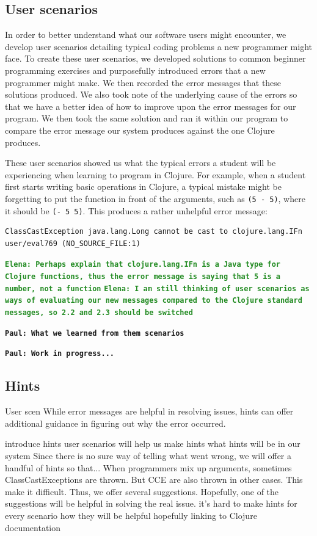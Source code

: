 \documentclass[12pt]{article}
\newcommand{\comment}[1]{{\bf \tt  {#1}}}
\newcommand{\emcomment}[1]{\textcolor{ForestGreen}{\comment{Elena: {#1}}}}
\newcommand{\pscomment}[1]{\textcolor{Coquelicot}{\comment{Paul: {#1}}}}
\begin{document}
\subsection{User scenarios}\label{sec:scenarios}

In order to better understand what our software users might encounter, we develop user scenarios detailing typical coding problems a new programmer might face.
To create these user scenarios, we developed solutions to common beginner programming exercises and purposefully introduced errors that a new programmer might make.
We then recorded the error messages that these solutions produced.
We also took note of the underlying cause of the errors so that we have a better idea of how to improve upon the error messages for our program.
We then took the same solution and ran it within our program to compare the error message our system produces against the one Clojure produces.  

These user scenarios showed us what the typical errors a student will be experiencing when learning to program in Clojure.
For example, when a student first starts writing basic operations in Clojure, a typical mistake might be forgetting to put the function in front of the arguments,
such as \texttt{(5 - 5)}, where it should be \texttt{(- 5 5)}. 
This produces a rather unhelpful error message: 

\begin{verbatim}
ClassCastException java.lang.Long cannot be cast to clojure.lang.IFn
user/eval769 (NO_SOURCE_FILE:1)
\end{verbatim}
\emcomment{Perhaps explain that clojure.lang.IFn is a Java type for Clojure functions, thus the error message is saying that 5 is a number, not a function}
\emcomment{I am still thinking of user scenarios as ways of evaluating our new messages compared to the Clojure standard messages, so 2.2 and 2.3 should be switched}

\pscomment{What we learned from them scenarios}

\pscomment{Work in progress...}

\subsection{Hints}\label{sec:hints}

User scen
While error messages are helpful in resolving issues, hints can offer additional guidance in figuring out why the error occurred. 

introduce hints
user scenarios will help us make hints
what hints will be in our system
Since there is no sure way of telling what went wrong, we will offer a handful of hints so that...
When programmers mix up arguments, sometimes ClassCastExceptions are thrown. But CCE are also thrown in other cases. This make it difficult. Thus, we offer several suggestions. Hopefully, one of the suggestions will be helpful in solving the real issue.
it's hard to make hints for every scenario
how they will be helpful
hopefully linking to Clojure documentation
\end{document}

